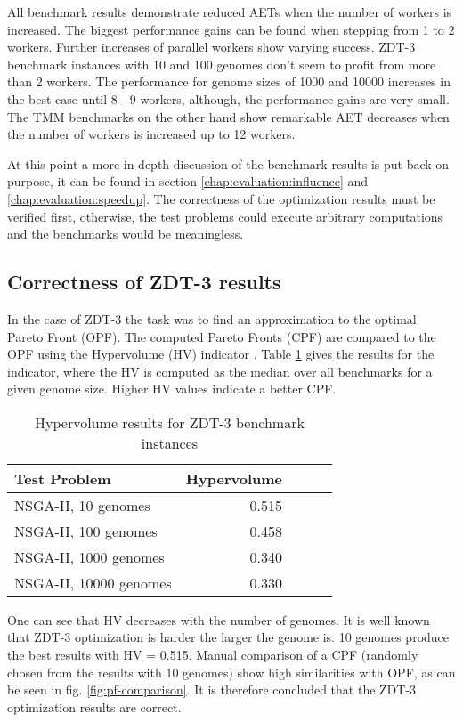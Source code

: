 All benchmark results demonstrate reduced AETs when the number of workers is increased. The biggest performance gains can be found when stepping from 1 to 2 workers. Further increases of parallel workers show varying success. ZDT-3 benchmark instances with 10 and 100 genomes don't seem to profit from more than 2 workers. The performance for genome sizes of 1000 and 10000 increases in the best case until 8 - 9 workers, although, the performance gains are very small. The TMM benchmarks on the other hand show remarkable AET decreases when the number of workers is increased up to 12 workers.

At this point a more in-depth discussion of the benchmark results is put back on purpose, it can be found in section \ref{chap:evaluation:influence} and \ref{chap:evaluation:speedup}. The correctness of the optimization results must be verified first, otherwise, the test problems could execute arbitrary computations and the benchmarks would be meaningless.

\subsection{Correctness of ZDT-3 results}
In the case of ZDT-3 the task was to find an approximation to the optimal Pareto Front (OPF). The computed Pareto Fronts (CPF) are compared to the OPF using the Hypervolume (HV) indicator \cite{zitzler1999multiobjective}. Table \ref{table:hypervolume} gives the results for the indicator, where the HV is computed as the median over all benchmarks for a given genome size. Higher HV values indicate a better CPF.

\begin{table}
  \centering
  \caption{Hypervolume results for ZDT-3 benchmark instances}
  \begin{tabular}{lrrrr}\toprule[2pt]
    Test Problem & Hypervolume \\ \midrule
    NSGA-II, 10 genomes & 0.515 \\
    NSGA-II, 100 genomes & 0.458 \\
    NSGA-II, 1000 genomes & 0.340 \\
    NSGA-II, 10000 genomes & 0.330 \\
  \end{tabular}
  \label{table:hypervolume}
\end{table}

One can see that HV decreases with the number of genomes. It is well known that ZDT-3 optimization is harder the larger the genome is. 10 genomes produce the best results with HV = 0.515. Manual comparison of a CPF (randomly chosen from the results with 10 genomes) show high similarities with OPF, as can be seen in fig. \ref{fig:pf-comparison}. It is therefore concluded that the ZDT-3 optimization results are correct.


